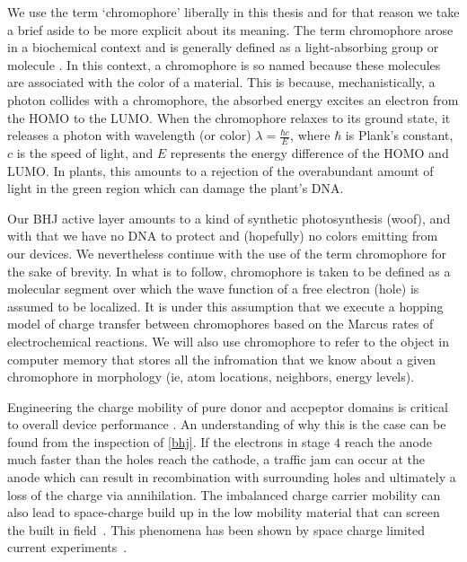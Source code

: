 We use the term `chromophore' liberally in this thesis and for that reason we take a brief aside to be more
explicit about its meaning.  
The term chromophore arose in a biochemical context and is generally defined
as a light-absorbing group or molecule \cite{biochemistry}.
In this context, a chromophore is so named because these molecules are associated with the color of a material.
This is because, mechanistically, a photon collides with a chromophore, the absorbed energy
excites an electron from the HOMO to the
LUMO. When the chromophore relaxes to its
ground state, it releases a photon with wavelength (or color) $\lambda = \frac{\hbar c}{E}$,
where $\hbar$ is Plank's constant, $c$ is the speed of light, and $E$ represents the
energy difference of the HOMO and LUMO. In plants, this amounts to a rejection of the overabundant amount of
light in the green region which can damage the plant's DNA. 

Our BHJ active layer amounts to a kind of synthetic photosynthesis (woof), and with that we have no DNA to
protect and (hopefully) no colors emitting from our devices. We nevertheless continue with the use of the term chromophore
for the sake of brevity. In what is to follow, chromophore is taken to be defined as a molecular segment over which the 
wave function of a free electron (hole) is assumed to be localized.
It is under this assumption that we execute a hopping model of charge transfer between
chromophores based on the Marcus rates of electrochemical reactions. We will also use chromophore to refer to
the object in computer memory that stores all the infromation that we know about a given chromophore in morphology
(ie, atom locations, neighbors, energy levels).


Engineering the charge mobility of pure donor and accpeptor domains is critical
to overall device performance \cite{Wang2019e}.
An understanding of why this is the case can be found from the inspection of \autoref{bhj}.
If the electrons in stage $4$ reach the anode much faster than the holes reach the cathode, a traffic jam can
occur at the anode which can result in recombination with surrounding holes and ultimately a loss of the
charge via annihilation. 
The imbalanced charge carrier mobility can also lead to space-charge build up in the 
low mobility material that can screen the built in field~\cite{Bartelt2015}.
This phenomena has been shown by space charge limited current experiments~\cite{Small2013}.


